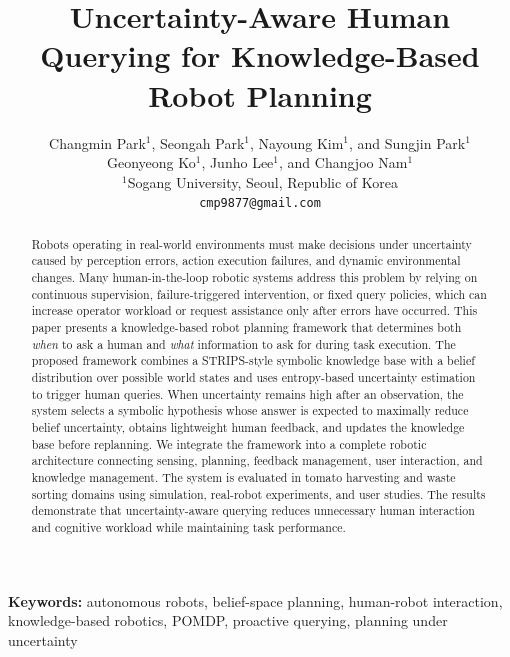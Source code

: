 \documentclass[12pt]{article}
\title{Uncertainty-Aware Human Querying for Knowledge-Based Robot Planning}
\author{
Changmin Park$^{1}$,
Seongah Park$^{1}$,
Nayoung Kim$^{1}$,
and Sungjin Park$^{1}$\\
Geonyeong Ko$^{1}$,
Junho Lee$^{1}$,
and Changjoo Nam$^{1}$\\
$^{1}$Sogang University, Seoul, Republic of Korea\\
\texttt{cmp9877@gmail.com}
}
\date{}
\begin{document}
\maketitle

\begin{abstract}
Robots operating in real-world environments must make decisions under uncertainty caused by perception errors, action execution failures, and dynamic environmental changes. Many human-in-the-loop robotic systems address this problem by relying on continuous supervision, failure-triggered intervention, or fixed query policies, which can increase operator workload or request assistance only after errors have occurred. This paper presents a knowledge-based robot planning framework that determines both \textit{when} to ask a human and \textit{what} information to ask for during task execution. The proposed framework combines a STRIPS-style symbolic knowledge base with a belief distribution over possible world states and uses entropy-based uncertainty estimation to trigger human queries. When uncertainty remains high after an observation, the system selects a symbolic hypothesis whose answer is expected to maximally reduce belief uncertainty, obtains lightweight human feedback, and updates the knowledge base before replanning. We integrate the framework into a complete robotic architecture connecting sensing, planning, feedback management, user interaction, and knowledge management. The system is evaluated in tomato harvesting and waste sorting domains using simulation, real-robot experiments, and user studies. The results demonstrate that uncertainty-aware querying reduces unnecessary human interaction and cognitive workload while maintaining task performance.
\end{abstract}

\noindent\textbf{Keywords:} autonomous robots, belief-space planning, human-robot interaction, knowledge-based robotics, POMDP, proactive querying, planning under uncertainty












\appendix

\end{document}
